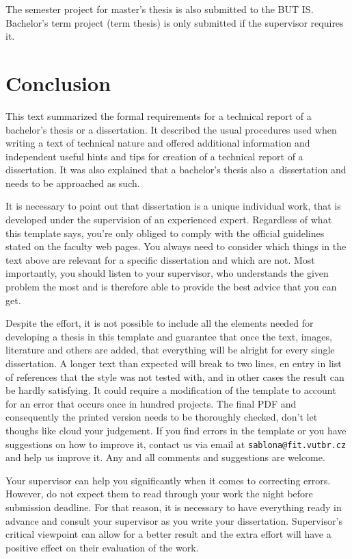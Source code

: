 The semester project for master's thesis is also submitted to the BUT IS. Bachelor's term project (term thesis) is only submitted if the supervisor requires it.

\chapter{Conclusion}
\label{zaver}

This text summarized the formal requirements for a technical report of a bachelor's thesis or a dissertation. It described the usual procedures used when writing a text of technical nature and offered additional information and independent useful hints and tips for creation of a technical report of a dissertation. It was also explained that a bachelor's thesis also a~dissertation and needs to be approached as such.

It is necessary to point out that dissertation is a unique individual work, that is developed under the supervision of an experienced expert. Regardless of what this template says, you're only obliged to comply with the official guidelines stated on the faculty web pages. You always need to consider which things in the text above are relevant for a specific dissertation and which are not. Most importantly, you should listen to your supervisor, who understands the given problem the most and is therefore able to provide the best advice that you can get.

Despite the effort, it is not possible to include all the elements needed for developing a thesis in this template and guarantee that once the text, images, literature and others are added, that everything will be alright for every single dissertation. A longer text than expected will break to two lines, en entry in list of references that the style was not tested with, and in other cases the result can be hardly satisfying. It could require a modification of the template to account for an error that occurs once in hundred projects. The final PDF and consequently the printed version needs to be thoroughly checked, don't let thoughs like  cloud your judgement. If you find errors in the template or you have suggestions on how to improve it, contact us via email at \texttt{sablona@fit.vutbr.cz} and help us improve it. Any and all comments and suggestions are welcome.

Your supervisor can help you significantly when it comes to correcting errors. However, do not expect them to read through your work the night before submission deadline. For that reason, it is necessary to have everything ready in advance and consult your supervisor as you write your dissertation. Supervisor's critical viewpoint can allow for a better result and the extra effort will have a positive effect on their evaluation of the work.


